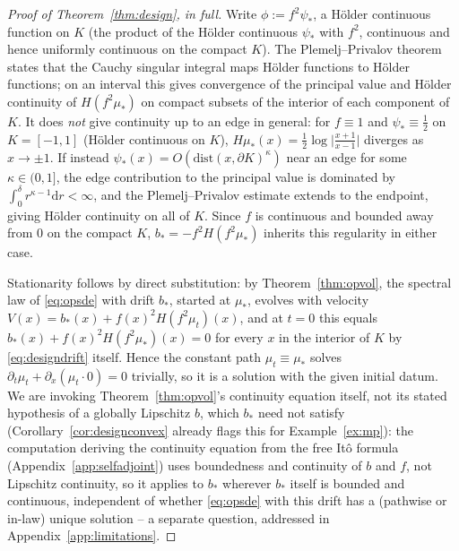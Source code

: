 \documentclass[11pt]{article}
\newcommand{\dd}{\mathrm{d}}
\theoremstyle{plain}
\theoremstyle{definition}
\theoremstyle{remark}
\begin{document}
\begin{proof}[Proof of Theorem~\ref{thm:design}, in full]
Write $\phi:=f^2\psi_*$, a H\"older continuous function on $K$ (the product of the
H\"older continuous $\psi_*$ with $f^2$, continuous and hence uniformly continuous on
the compact $K$). The Plemelj--Privalov theorem \citep[\S\S18--19]{Muskhelishvili1953}
states that the Cauchy singular integral maps H\"older functions to H\"older
functions; on an interval this gives convergence of the principal value and H\"older
continuity of $H(f^2\mu_*)$ on compact subsets of the interior of each component of
$K$. It does \emph{not} give continuity up to an edge in general: for $f\equiv1$ and
$\psi_*\equiv\tfrac12$ on $K=[-1,1]$ (H\"older continuous on $K$), $H\mu_*(x)=\tfrac12
\log\lvert\tfrac{x+1}{x-1}\rvert$ diverges as $x\to\pm1$. If instead $\psi_*(x)=
O(\mathrm{dist}(x,\partial K)^\kappa)$ near an edge for some $\kappa\in(0,1]$, the edge
contribution to the principal value is dominated by $\int_0^\delta r^{\kappa-1}\dd
r<\infty$, and the Plemelj--Privalov estimate extends to the endpoint, giving H\"older
continuity on all of $K$. Since $f$ is continuous and bounded away from $0$ on the
compact $K$, $b_*=-f^2H(f^2\mu_*)$ inherits this regularity in either case.

Stationarity follows by direct substitution: by Theorem~\ref{thm:opvol}, the spectral
law of \eqref{eq:opsde} with drift $b_*$, started at $\mu_*$, evolves with velocity
$V(x)=b_*(x)+f(x)^2H(f^2\mu_t)(x)$, and at $t=0$ this equals $b_*(x)+f(x)^2H(f^2\mu_*)
(x)=0$ for every $x$ in the interior of $K$ by \eqref{eq:designdrift} itself. Hence
the constant path $\mu_t\equiv\mu_*$ solves $\partial_t\mu_t+\partial_x(\mu_t\cdot0)=0$
trivially, so it is a solution with the given initial datum. We are invoking
Theorem~\ref{thm:opvol}'s continuity equation itself, not its stated hypothesis of a
globally Lipschitz $b$, which $b_*$ need not satisfy (Corollary~\ref{cor:designconvex}
already flags this for Example~\ref{ex:mp}): the computation deriving the continuity
equation from the free It\^o formula (Appendix~\ref{app:selfadjoint}) uses boundedness
and continuity of $b$ and $f$, not Lipschitz continuity, so it applies to $b_*$
wherever $b_*$ itself is bounded and continuous, independent of whether
\eqref{eq:opsde} with this drift has a (pathwise or in-law) unique solution -- a
separate question, addressed in Appendix~\ref{app:limitations}.
\end{proof}
\end{document}
